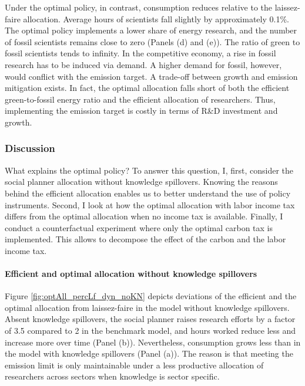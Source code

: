 Under the optimal policy, in contrast, consumption reduces relative to the laissez-faire allocation. Average hours of scientists fall slightly by approximately 0.1\%. The optimal policy implements a lower share of energy research, and the number of fossil scientists remains close to zero (Panels (d) and (e)). The ratio of green to fossil scientists tends to infinity. 
In the competitive economy, a rise in fossil research has to be induced via demand. A higher demand for fossil, however, would conflict with the emission target. A trade-off between growth and emission mitigation exists.  In fact, the optimal allocation falls short of both the efficient green-to-fossil energy ratio and the efficient allocation of researchers. Thus, implementing the emission target is costly in terms of R\&D investment and growth.


\subsubsection{Discussion}\label{subsec:dis}

 What explains the optimal policy?  To answer this question, I, first, consider the social planner allocation without knowledge spillovers. Knowing the reasons behind the efficient allocation enables us to better understand the use of policy instruments. Second, I look at how the optimal allocation with labor income tax differs from the optimal allocation when no income tax is available. 
Finally, I conduct a counterfactual experiment where only the optimal carbon tax is implemented. This allows to decompose the effect of the carbon and the labor income tax. 

\paragraph{Efficient and optimal allocation without knowledge spillovers}
Figure \ref{fig:optAll_percLf_dyn_noKN} depicts deviations of the efficient and the optimal allocation from laissez-faire in the model without knowledge spillovers.
Absent knowledge spillovers, the social planner raises research efforts  by a factor of 3.5 compared to 2 in the benchmark model, and hours worked reduce less and increase more over time (Panel (b)). Nevertheless, consumption grows less than in the model with knowledge spillovers (Panel (a)). The reason is that meeting the emission limit is only maintainable under a less productive allocation of researchers across sectors when knowledge is sector specific. 

